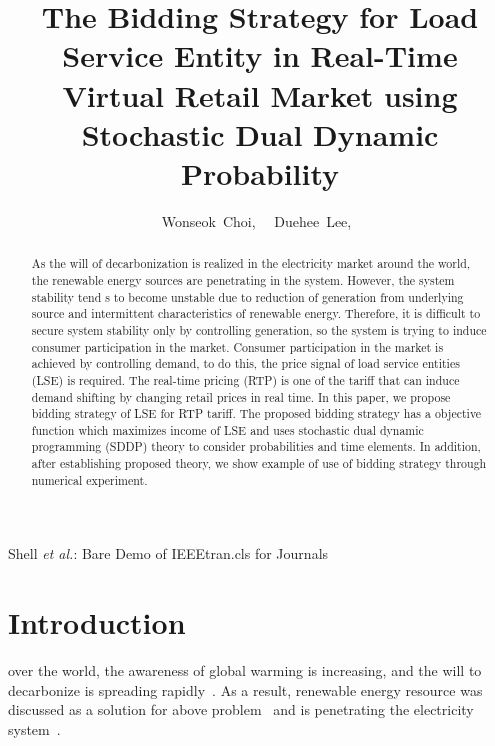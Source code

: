 \documentclass[journal]{IEEEtran} %
\begin{document}
\title{The Bidding Strategy for Load Service Entity in Real-Time Virtual Retail Market using Stochastic Dual Dynamic Probability}

\author{Wonseok~Choi,~ 
	~Duehee~Lee,~
	}


%
{Shell \MakeLowercase{\textit{et al.}}: Bare Demo of IEEEtran.cls for Journals}
\maketitle

\begin{abstract}
As the will of decarbonization is realized in the electricity market around the world, the renewable energy sources are penetrating in the system. However, the system stability tend s to become unstable due to reduction of generation from underlying source and intermittent characteristics of renewable energy. Therefore, it is difficult to secure system stability only by controlling generation, so the system is trying to induce consumer participation in the market. Consumer participation in the market is achieved by controlling demand, to do this, the price signal of load service entities (LSE) is required. The real-time pricing (RTP) is one of the tariff that can induce demand shifting by changing retail prices in real time. In this paper, we propose bidding strategy of LSE for RTP tariff. The proposed bidding strategy has a objective function which maximizes income of LSE and uses stochastic dual dynamic programming (SDDP) theory to consider probabilities and time elements. In addition, after establishing proposed theory, we show example of use of bidding strategy through numerical experiment.
\end{abstract}






\section{Introduction}

 over the world, the awareness of global warming is increasing, and the will to decarbonize is spreading rapidly~\cite{rockstrom2017roadmap}. As a result, renewable energy resource was discussed as a solution for above problem~\cite{shahzad2012need} and is penetrating the electricity system~\cite{Bull2001,ranalder2021renewables}. 
\end{document}
